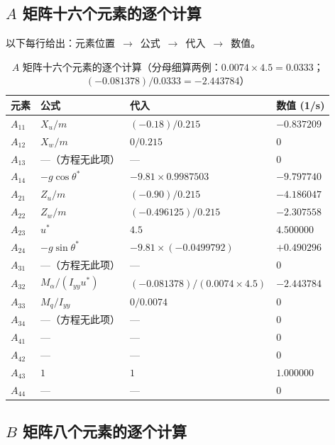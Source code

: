 \documentclass[11pt,a4paper]{ctexart}
\begin{document}
\subsection{\texorpdfstring{$A$}{A} 矩阵十六个元素的逐个计算}

以下每行给出：元素位置~$\to$~公式~$\to$~代入~$\to$~数值。

\begin{table}[htbp]
\centering\small
\begin{tabular}{llll}
\toprule
元素 & 公式 & 代入 & 数值 (1/s) \\
\midrule
$A_{11}$ & $X_u/m$ & $(-0.18)/0.215$ & $-0.837209$ \\
$A_{12}$ & $X_w/m$ & $0/0.215$ & $0$ \\
$A_{13}$ & —（方程无此项） & — & $0$ \\
$A_{14}$ & $-g\cos\theta^{*}$ & $-9.81\times 0.9987503$ & $-9.797740$ \\
$A_{21}$ & $Z_u/m$ & $(-0.90)/0.215$ & $-4.186047$ \\
$A_{22}$ & $Z_w/m$ & $(-0.496125)/0.215$ & $-2.307558$ \\
$A_{23}$ & $u^{*}$ & $4.5$ & $4.500000$ \\
$A_{24}$ & $-g\sin\theta^{*}$ & $-9.81\times(-0.0499792)$ & $+0.490296$ \\
$A_{31}$ & —（方程无此项） & — & $0$ \\
$A_{32}$ & $M_\alpha/(I_{yy}u^{*})$ & $(-0.081378)/(0.0074\times 4.5)$ & $-2.443784$ \\
$A_{33}$ & $M_q/I_{yy}$ & $0/0.0074$ & $0$ \\
$A_{34}$ & —（方程无此项） & — & $0$ \\
$A_{41}$ & — & — & $0$ \\
$A_{42}$ & — & — & $0$ \\
$A_{43}$ & $1$ & $1$ & $1.000000$ \\
$A_{44}$ & — & — & $0$ \\
\bottomrule
\end{tabular}
\caption{$A$ 矩阵十六个元素的逐个计算（分母细算两例：$0.0074\times 4.5=0.0333$；$(-0.081378)/0.0333=-2.443784$）}
\end{table}

\subsection{\texorpdfstring{$B$}{B} 矩阵八个元素的逐个计算}
\end{document}
